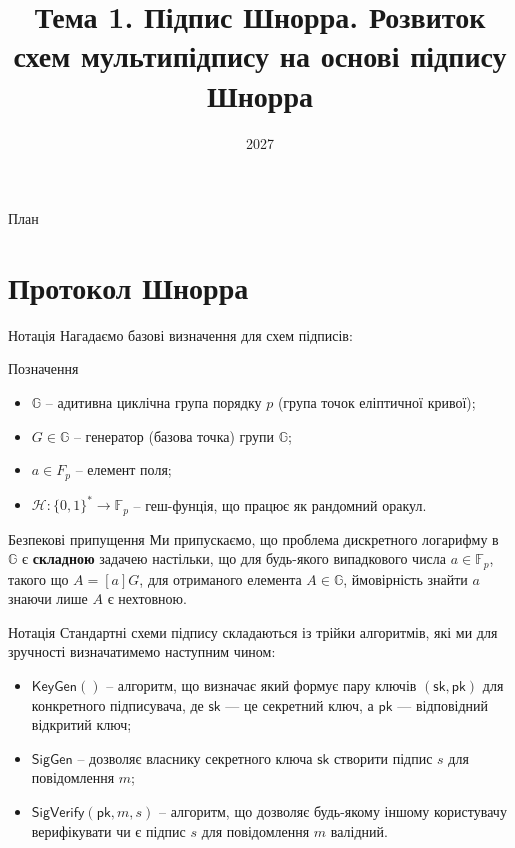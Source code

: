 \documentclass{../zkdl-presentation-template}
\title[Асиметричні протоколи]{\textbf{Тема 1. Підпис Шнорра. Розвиток схем мультипідпису на основі підпису Шнорра}}
\date{2027}
\begin{document}
    \begin{frame}

        \titlepage
    \end{frame}
  
    \begin{frame}{План}
        \tableofcontents
    \end{frame}

\section{Протокол Шнорра}
\begin{frame}{ Нотація}
  Нагадаємо базові визначення для схем підписів:
  \begin{alertblock}{Позначення}
    \begin{itemize}
        \item $\mathbb{G}$ -- адитивна циклічна група порядку $p$ (група точок еліптичної кривої);
        \item $G\in \mathbb{G}$ -- генератор (базова точка) групи $\mathbb{G}$;
        \item $a\in F_p$ -- елемент поля;
        \item $\mathcal{H}: \{0,1\}^* \to \mathbb{F}_p$ -- геш-фунція, що працює як рандомний оракул.
    \end{itemize}
  \end{alertblock}
  \begin{block}{Безпекові припущення}
    Ми припускаємо, що проблема дискретного логарифму в $\mathbb{G}$ є \textbf{складною} задачею настільки, що для будь-якого випадкового числа $a \in \mathbb{F}_p$, такого що $A = [a]G$, для отриманого елемента $A \in \mathbb{G}$, ймовірність знайти $a$ знаючи лише $A$ є нехтовною.
  \end{block}
\end{frame}


\begin{frame}{ Нотація}
  Стандартні схеми підпису складаються із трійки алгоритмів, які ми для зручності визначатимемо наступним чином:
  \begin{alertblock}{}
    \begin{itemize}
        \item $\mathsf{KeyGen()}$ -- алгоритм, що визначає який формує пару ключів $(\mathsf{sk},\mathsf{pk})$ для конкретного підписувача, де $\mathsf{sk}$ — це секретний ключ, а $\mathsf{pk}$ — відповідний відкритий ключ;
        \item $\mathsf{SigGen}$ -- дозволяє власнику секретного ключа $\mathsf{sk}$ створити підпис $s$ для повідомлення $m$;
        \item $\mathsf{SigVerify}(\mathsf{pk}, m,s)$ -- алгоритм, що дозволяє будь-якому іншому користувачу верифікувати чи є підпис $s$ для повідомлення $m$ валідний.
    \end{itemize}
  \end{alertblock}
\end{frame}
\end{document}
